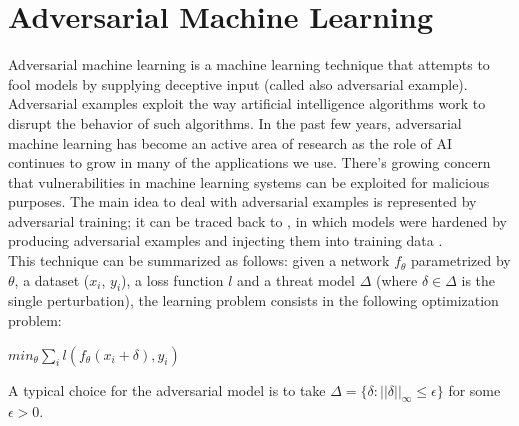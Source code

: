 \documentclass{article}
\begin{document}
\section{Adversarial Machine Learning}
Adversarial machine learning is a machine learning technique that attempts to
fool models by supplying deceptive input (called also adversarial example).
Adversarial examples exploit the way artificial intelligence algorithms work to
disrupt the behavior of such algorithms. In the past few years, adversarial
machine learning has become an active area of research as the role of AI
continues to grow in many of the applications we use. There’s growing concern
that vulnerabilities in machine learning systems can be exploited for malicious
purposes. The main idea to deal with adversarial examples is represented by
adversarial training; it can be traced back to \cite{GoodfellowEtAl2015}, in
which models were hardened by producing adversarial examples and injecting them
into training data \cite{ShafahiEtAl2019b}.\\
This technique can be summarized as follows: given a network $f_{\theta}$
parametrized by $\theta$, a dataset ($x_i$, $y_i$), a loss function $l$ and a
threat model $\Delta$ (where $\delta \in \Delta$ is the single perturbation), the learning problem consists in the following
optimization problem:
\begin{center}
	$min_{\theta}{\sum_{i}l(f_{\theta}(x_i + \delta), y_i)}$
\end{center}
A typical choice for the adversarial model is to take $\Delta = \{\delta :
||\delta||_{\infty} \le \epsilon\}$ for some $\epsilon > 0$.
\end{document}
